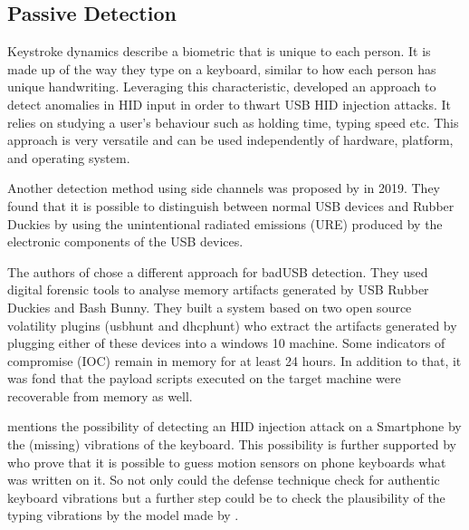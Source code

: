 \subsection{Passive Detection}


Keystroke dynamics describe a biometric that is unique to each person. It is made up of the way they type on a keyboard, similar to how each person has unique handwriting. Leveraging this characteristic, \cite{barbhuiyaAnomalyBasedApproach2012} developed an approach to detect anomalies in HID input in order to thwart USB HID injection attacks. It relies on studying a user's behaviour such as holding time, typing speed etc. This approach is very versatile and can be used independently of hardware, platform, and operating system.  

Another detection method using side channels was proposed by \cite{ibrahimRFDNAFingerprintingDetection2019} in 2019. They found that it is possible to distinguish between normal USB devices and Rubber Duckies by using the unintentional radiated emissions (URE) produced by the electronic components of the USB devices. 

The authors of \cite{thomasDuckHuntMemory2021} chose a different approach for badUSB detection. They used digital forensic tools to analyse memory artifacts generated by USB Rubber Duckies and Bash Bunny. They built a system based on two open source volatility plugins (usbhunt and dhcphunt) who extract the artifacts generated by plugging either of these devices into a windows 10 machine. Some indicators of compromise (IOC) remain in memory for at least 24 hours. In addition to that, it was fond that the payload scripts executed on the target machine were recoverable from memory as well. 

\cite{bojovicRisingThreatHardware2019} mentions the possibility of detecting an HID injection attack on a Smartphone by the (missing) vibrations of the keyboard. This possibility is further supported by \cite{zhuangKeyboardAcousticEmanations2009} who prove that it is possible to guess motion sensors on phone keyboards what was written on it. So not only could the defense technique check for authentic keyboard vibrations but a further step could be to check the plausibility of the typing vibrations by the model made by \cite{zhuangKeyboardAcousticEmanations2009}. 

